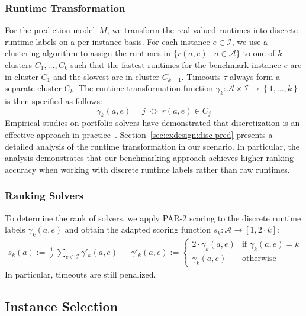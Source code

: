 \documentclass[sn-basic, Numbered]{sn-jnl} %
\begin{document}
\subsubsection{Runtime Transformation}
\label{sec:main:model:transformation}

For the prediction model~$M$, we transform the real-valued runtimes into discrete runtime labels on a per-instance basis.
For each instance $e \in \mathcal{I}$, we use a clustering algorithm to assign the runtimes in $\bigl\{ r(a, e) \mid a \in \mathcal{A} \bigr\}$ to one of $k$ clusters $C_1, \dots, C_k$ such that the fastest runtimes for the benchmark instance $e$ are in cluster $C_1$ and the slowest are in cluster $C_{k-1}$.
Timeouts $\tau$ always form a separate cluster $C_{k}$.
The runtime transformation function $\gamma_k : {\mathcal{A} \times \mathcal{I}} \rightarrow \left\lbrace 1, \dots, k \right\rbrace$ is then specified as follows:
%
$$\gamma_k(a, e) = j ~\Leftrightarrow~ r(a, e) \in C_j$$
%
Empirical studies on portfolio solvers have demonstrated that discretization is an effective approach in practice~\cite{CollauttiMMO13,NgokoCT19}.
Section~\ref{sec:exdesign:disc-pred} presents a detailed analysis of the runtime transformation in our scenario.
In particular, the analysis demonstrates that our benchmarking approach achieves higher ranking accuracy when working with discrete runtime labels rather than raw runtimes.

\subsubsection{Ranking Solvers}
\label{sec:main:model:ranking}

To determine the rank of solvers, we apply PAR-2 scoring to the discrete runtime labels $\gamma_k(a, e)$ and obtain the adapted scoring function $s_k : \mathcal{A} \rightarrow [1, 2 \cdot k]$:
%
\begin{align}
  s_k(a) := \frac{1}{|\mathcal{I}|} \sum_{e \in \mathcal{I}} \gamma'_k(a, e)
  &&
  \gamma'_k(a, e) := \begin{cases}
    2 \cdot \gamma_k(a, e)   & \text{if } \gamma_k(a, e) = k\\
  \gamma_k(a, e)  & \text{otherwise}
  \end{cases}
  \label{eq:rankingeq}
\end{align}
%
In particular, timeouts are still penalized.

\subsection{Instance Selection}
\label{sec:main:selection}
\end{document}
